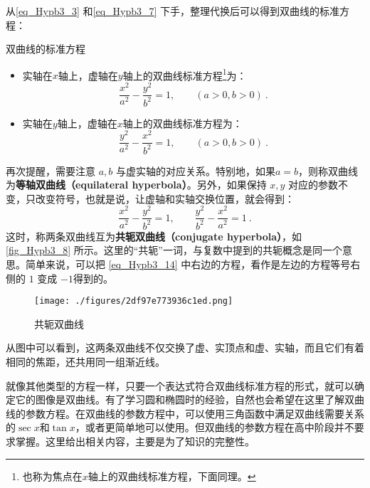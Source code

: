 从\autoref{eq_Hypb3_3} 和\autoref{eq_Hypb3_7} 下手，整理代换后可以得到双曲线的标准方程：

\begin{theorem}{双曲线的标准方程}
\begin{itemize}
\item 实轴在$x$轴上，虚轴在$y$轴上的双曲线标准方程\footnote{也称为焦点在$x$轴上的双曲线标准方程，下面同理。}为：
\begin{equation}\label{eq_Hypb3_4}
\frac{x^2}{a^2} - \frac{y^2}{b^2} = 1,\qquad(a>0,b>0)~.
\end{equation}
\item 实轴在$y$轴上，虚轴在$x$轴上的双曲线标准方程为：
\begin{equation}
\frac{y^2}{a^2} -\frac{x^2}{b^2}  = 1,\qquad(a>0,b>0)~.
\end{equation}
\end{itemize}
\end{theorem}

再次提醒，需要注意 $a,b$ 与虚实轴的对应关系。特别地，如果$a=b$，则称双曲线为\textbf{等轴双曲线（equilateral hyperbola）}。另外，如果保持 $x,y$ 对应的参数不变，只改变符号，也就是说，让虚轴和实轴交换位置，就会得到：
\begin{equation}\label{eq_Hypb3_14}
\frac{x^2}{a^2} - \frac{y^2}{b^2} = 1,\qquad \frac{y^2}{b^2} - \frac{x^2}{a^2} = 1 ~.
\end{equation}
这时，称两条双曲线互为\textbf{共轭双曲线（conjugate hyperbola）}，如\autoref{fig_Hypb3_8} 所示。这里的“共轭”一词，与复数中提到的共轭概念是同一个意思。简单来说，可以把 \autoref{eq_Hypb3_14} 中右边的方程，看作是左边的方程等号右侧的 $1$ 变成 $-1$得到的。
\begin{figure}[ht]
\centering
\texttt{[image: ./figures/2df97e773936c1ed.png]}
\caption{共轭双曲线} \label{fig_Hypb3_8}
\end{figure}
从图中可以看到，这两条双曲线不仅交换了虚、实顶点和虚、实轴，而且它们有着相同的焦距，还共用同一组渐近线。

就像其他类型的方程一样，只要一个表达式符合双曲线标准方程的形式，就可以确定它的图像是双曲线。有了学习圆和椭圆时的经验，自然也会希望在这里了解双曲线的参数方程。在双曲线的参数方程中，可以使用三角函数中满足双曲线需要关系的$\sec x$和$\tan x$，或者更简单地可以使用。但双曲线的参数方程在高中阶段并不要求掌握。这里给出相关内容，主要是为了知识的完整性。

